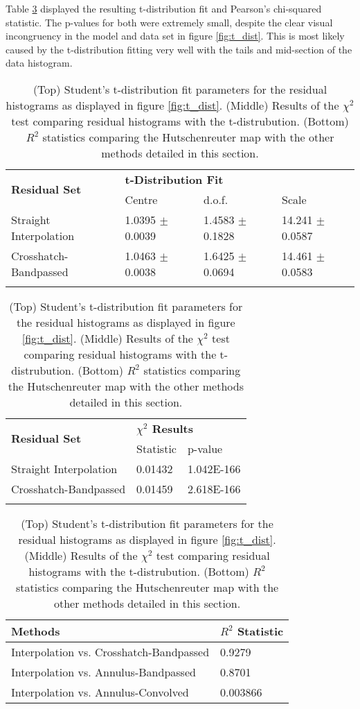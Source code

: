 Table \ref{tab:fr_stats} displayed the resulting t-distribution fit and Pearson's chi-squared statistic. The p-values for both were extremely small, despite the clear visual incongruency in the model and data set in figure \ref{fig:t_dist}. This is most likely caused by the t-distribution fitting very well with the tails and mid-section of the data histogram.

\begin{table}
    \centering
    \begin{tabular}{l l l l}
        \hline
        \multirow{2}{*}{\bfseries{Residual Set}} & \multicolumn{3}{l}{\bfseries{t-Distribution Fit}} \\
        & Centre & d.o.f. & Scale \\
        \hline
        Straight Interpolation & 1.0395 $\pm$ 0.0039 & 1.4583 $\pm$ 0.1828 & 14.241 $\pm$ 0.0587 \\
        Crosshatch-Bandpassed & 1.0463 $\pm$ 0.0038 & 1.6425 $\pm$ 0.0694 & 14.461 $\pm$ 0.0583 \\
        \hline
        & & & \\
    \end{tabular}
    \begin{tabular}{l l l}
        \hline
        \multirow{2}{*}{\bfseries{Residual Set}} & \multicolumn{2}{l}{\bfseries{$\chi^2$ Results}} \\
        & Statistic & p-value \\
        \hline
        Straight Interpolation & 0.01432 & 1.042E-166 \\
        Crosshatch-Bandpassed & 0.01459 & 2.618E-166 \\
        \hline
        & & \\
    \end{tabular}
    \begin{tabular}{l l}
        \hline
        \bfseries{Methods} & \bfseries{$R^2$ Statistic} \\
        \hline
        Interpolation vs. Crosshatch-Bandpassed & 0.9279 \\
        Interpolation vs. Annulus-Bandpassed & 0.8701 \\
        Interpolation vs. Annulus-Convolved & 0.003866 \\
        \hline
    \end{tabular}
    \caption{(Top) Student's t-distribution fit parameters for the residual histograms as displayed in figure \ref{fig:t_dist}. (Middle) Results of the $\chi^2$ test comparing residual histograms with the t-distrubution. (Bottom) $R^2$ statistics comparing the Hutschenreuter map with the other methods detailed in this section.}
    \label{tab:fr_stats}
\end{table}

